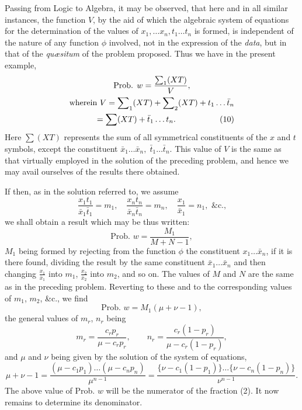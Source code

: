 \documentclass[oneside]{book}
\begin{document}
Passing from Logic to Algebra, it may be observed, that
here and in all similar instances, the function $V$, by the aid of
which the algebraic system of equations for the determination of
the values of $x_1, \dotsc x_n, t_1 \dotsc t_n$ is formed, is independent of the
nature of any function $\phi$ involved, not in the expression of the
\emph{data}, but in that of the \textit{qu{\ae}situm} of the problem proposed. Thus
we have in the present example,
\begin{multline*}
  \hfill \text{Prob. }w = \frac{\sum\nolimits_1 (XT)}{V}, \hfill \\
  \text{wherein }\hfill
  V = \sum\nolimits_1 (X T) + \sum\nolimits_2 (X T)
      + t_1 \dotsc \bar{t}_n \hfill \\
  \hfill = \sum (XT) + \bar{t}_1 \dotsc t_n. \hfill \tag{10}
\end{multline*}
Here $\sum (X T)$ represents the sum of all symmetrical constituents
of the $x$ and $t$ symbols, except the constituent
$\bar{x}_1 \dotsc \bar{x}_n,\; \bar{t}_1 \dotsc \bar{t}_n$.
This value of $V$ is the same as that virtually employed in the solution of the preceding problem, and hence we may avail ourselves of the results there obtained.

If then, as in the solution referred to, we assume
\[
  \frac{x_1 t_1}{\bar{x}_1 \bar{t}_1} = m_1,\quad
  \frac{x_n t_n}{\bar{x}_n \bar{t}_n} = m_n,\quad
  \frac{x_1}{\bar{x}_1} = n_1, \text{ \&c.,}
\]
we shall obtain a result which may be thus written:
\[
  \text{Prob. }w = \frac{M_1}{M + N - 1},   \tag{11}
\]
$M_1$ being formed by rejecting from the function $\phi$ the constituent
$x_1 \dotsc \bar{x}_n$, if it is there found, dividing the result by the same constituent $\bar{x}_1 \dotsc \bar{x}_n$ and then changing
$\frac{x_1}{\bar{x}_1}$ into $m_1$,
$\frac{x_2}{\bar{x}_2}$ into $m_2$, and
so on. The values of $M$ and $N$ are the same as in the preceding
problem. Reverting to these and to the corresponding values of
$m_1$, $m_2$, \&c., we find
\[
  \text{Prob. }w = M_1(\mu + \nu - 1),
\]
the general values of $m_r$, $n_r$ being
\[
  m_r = \frac{c_r p_r}{\mu - c_rp_r},\qquad
  n_r = \frac{c_r(1-p_r)}{\mu - c_r(1-p_r)},
\]
and $\mu$ and $\nu$ being given by the solution of the system of equations,
\[
\mu + \nu -1 = \frac{(\mu-c_1p_1)\dotsc (\mu-c_np_n)}{\mu^{n-1}}
= \frac{ \{\nu-c_1(1-p_1)\} \dotsc \{\nu-c_n(1-p_n)\} }{\nu^{n-1}} .
\]
The above value of Prob. $w$ will be the numerator of the fraction
(2). It now remains to determine its denominator.
\end{document}
